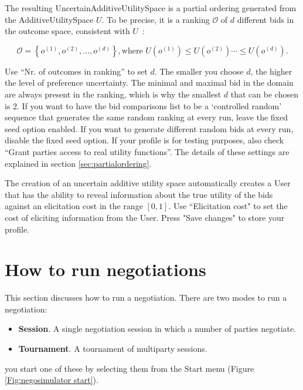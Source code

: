 \documentclass[]{llncs}
\begin{document}
The resulting UncertainAdditiveUtilitySpace is a partial ordering generated from the AdditiveUtilitySpace $U$. To be precise, it is a ranking $\mathcal{O}$ of $d$ different bids in the outcome space, consistent with $U$~\cite{Tsi18}:

\begin{equation} 
\mathcal{O}=\left\{o^{(1)},o^{(2)}, \dots, o^{(d)} \right\}, \textrm{where } U(o^{(1)}) \leq U(o^{(2)}) \cdots \leq U(o^{(d)}).
\end{equation}


Use ``Nr. of outcomes in ranking'' to set $d$. The smaller you choose $d$, the higher the level of preference uncertainty. The minimal and maximal bid in the domain are always present in the ranking, which is why the smallest $d$ that can be chosen is 2. If you want to have the bid comparisons list to be a `controlled random' sequence that generates the same random ranking at every run, leave the fixed seed option enabled. If you want to generate different random bids at every run, disable the fixed seed option. If your profile is for testing purposes, also check ``Grant parties access to real utility functions''. The details of these settings are explained in section \ref{sec:partialordering}. 

The creation of an uncertain additive utility space automatically creates a User that has the ability to reveal information about the true utility of the bids against an elicitation cost in the range $[0,1]$. Use ``Elicitation cost" to set the cost of eliciting information from the User. Press "Save changes" to store your profile.

\section{How to run negotiations}
This section discusses how to run a negotiation. There are two modes to run a negotiation:

\begin{itemize}
	\item \textbf{Session}. A single negotiation session in which a number of parties negotiate.
	\item \textbf{Tournament}. A tournament of multiparty sessions.
\end{itemize}

you start one of these by selecting them from the Start menu (Figure \ref{Fig:negosimulator start}).
\end{document}
